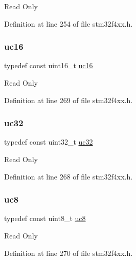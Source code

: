 Read Only 

Definition at line 254 of file stm32f4xx.\+h.

\mbox{\label{group___exported__types_gabc715ea3779494b5a4f53173a397f7cb}} 
\subsubsection{\texorpdfstring{uc16}{uc16}}
{\footnotesize\ttfamily typedef const uint16\+\_\+t \hyperlink{group___exported__types_gabc715ea3779494b5a4f53173a397f7cb}{uc16}}

Read Only 

Definition at line 269 of file stm32f4xx.\+h.

\mbox{\label{group___exported__types_ga5b628e6a05856ff67e535fa391a57683}} 
\subsubsection{\texorpdfstring{uc32}{uc32}}
{\footnotesize\ttfamily typedef const uint32\+\_\+t \hyperlink{group___exported__types_ga5b628e6a05856ff67e535fa391a57683}{uc32}}

Read Only 

Definition at line 268 of file stm32f4xx.\+h.

\mbox{\label{group___exported__types_gac74022c74a461f810e0d4fdc9bfea480}} 
\subsubsection{\texorpdfstring{uc8}{uc8}}
{\footnotesize\ttfamily typedef const uint8\+\_\+t \hyperlink{group___exported__types_gac74022c74a461f810e0d4fdc9bfea480}{uc8}}

Read Only 

Definition at line 270 of file stm32f4xx.\+h.

\mbox{\label{group___exported__types_ga369ae0177b957e5afa7c1e62312f97c3}} 
